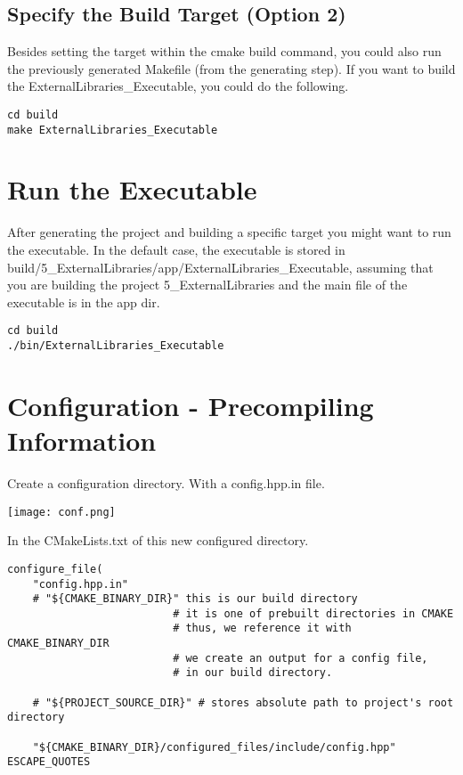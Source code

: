 \subsection{Specify the Build Target (Option 2)}


Besides setting the target within the cmake build command, you could also run the previously generated Makefile (from the generating step).
If you want to build the ExternalLibraries\_Executable, you could do the following.

\begin{verbatim}
cd build
make ExternalLibraries_Executable
\end{verbatim}


\section{Run the Executable}

After generating the project and building a specific target you might want to run the executable.
In the default case, the executable is stored in build/5\_ExternalLibraries/app/ExternalLibraries\_Executable, assuming that you are building the project 5\_ExternalLibraries and the main file of the executable is in the app dir.

\begin{verbatim}
cd build
./bin/ExternalLibraries_Executable
\end{verbatim}



\section{Configuration - Precompiling Information}

Create a configuration directory. With a config.hpp.in file.

\begin{center}
    \texttt{[image: conf.png]}
\end{center}

In the CMakeLists.txt of this new configured directory.

\begin{verbatim}
configure_file(
    "config.hpp.in"
    # "${CMAKE_BINARY_DIR}" this is our build directory
                          # it is one of prebuilt directories in CMAKE
                          # thus, we reference it with CMAKE_BINARY_DIR
                          # we create an output for a config file, 
                          # in our build directory.

    # "${PROJECT_SOURCE_DIR}" # stores absolute path to project's root directory

    "${CMAKE_BINARY_DIR}/configured_files/include/config.hpp" ESCAPE_QUOTES 
\end{verbatim}

